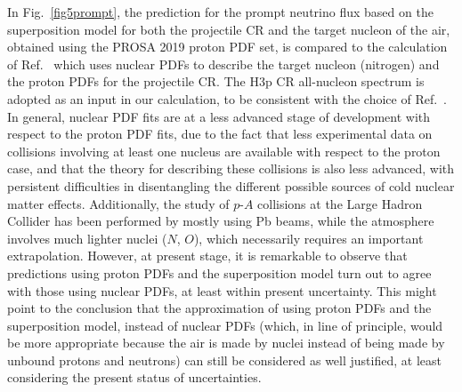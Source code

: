 \documentclass[12pt]{article}
\begin{document}
In Fig.~\ref{fig5prompt}, the prediction for the prompt neutrino flux based on the superposition model for both the projectile 
CR and the target nucleon of the air, obtained using the PROSA 2019 proton PDF set, is compared to the calculation of Ref.~\cite{Bhattacharya:2016jce} which uses nuclear PDFs to describe the target nucleon (nitrogen) and the proton PDFs for the projectile CR. The H3p CR all-nucleon spectrum is adopted as an input in our calculation, to be consistent with the choice of Ref.~\cite{Bhattacharya:2016jce}. In general, nuclear PDF fits are at a less advanced stage of development with respect to the proton PDF fits, due to the fact that less experimental data on collisions involving at least one nucleus are available with respect to the proton case, and that the theory for describing these collisions is also less advanced, with persistent difficulties in disentangling the different possible sources of cold nuclear matter effects. Additionally, the study of $p$-$A$ collisions at the Large Hadron Collider has been performed by mostly using Pb beams, while the atmosphere involves much lighter nuclei ($N$, $O$), which necessarily requires an important extrapolation.    
However, at present stage, it is remarkable to observe that predictions using proton PDFs and the superposition model turn out to agree with those using nuclear PDFs, at least within present uncertainty. 
This might point to the conclusion that 
the approximation of using proton PDFs and the superposition model, instead of nuclear PDFs (which, in line of principle, would be more appropriate because the air is made by nuclei instead of being made by unbound protons and neutrons) can still be considered as well justified, at least considering the present status of uncertainties. 
     
\end{document}
